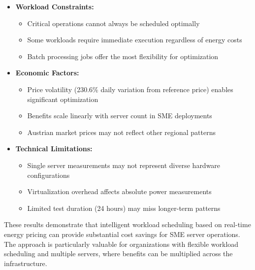 \begin{itemize}[noitemsep,topsep=0pt]
    \item \textbf{Workload Constraints:}
    \begin{itemize}[noitemsep]
        \item Critical operations cannot always be scheduled optimally
        \item Some workloads require immediate execution regardless of energy costs
        \item Batch processing jobs offer the most flexibility for optimization
    \end{itemize}
    
    \item \textbf{Economic Factors:}
    \begin{itemize}[noitemsep]
        \item Price volatility (230.6\%  daily variation from reference price) enables significant optimization
        \item Benefits scale linearly with server count in SME deployments
        \item Austrian market prices may not reflect other regional patterns
    \end{itemize}
    
    \item \textbf{Technical Limitations:}
    \begin{itemize}[noitemsep]
        \item Single server measurements may not represent diverse hardware configurations
        \item Virtualization overhead affects absolute power measurements
        \item Limited test duration (24 hours) may miss longer-term patterns
    \end{itemize}
\end{itemize}

These results demonstrate that intelligent workload scheduling based on real-time energy pricing can provide substantial cost savings for SME server operations. The approach is particularly valuable for organizations with flexible workload scheduling and multiple servers, where benefits can be multiplied across the infrastructure. 